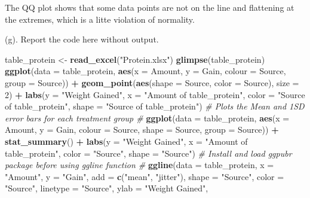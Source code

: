 \documentclass[]{article}
\newenvironment{Shaded}{\begin{snugshade}}{\end{snugshade}}
\newcommand{\CommentTok}[1]{\textcolor[rgb]{0.56,0.35,0.01}{\textit{#1}}}
\newcommand{\DataTypeTok}[1]{\textcolor[rgb]{0.13,0.29,0.53}{#1}}
\newcommand{\DecValTok}[1]{\textcolor[rgb]{0.00,0.00,0.81}{#1}}
\newcommand{\KeywordTok}[1]{\textcolor[rgb]{0.13,0.29,0.53}{\textbf{#1}}}
\newcommand{\NormalTok}[1]{#1}
\newcommand{\OperatorTok}[1]{\textcolor[rgb]{0.81,0.36,0.00}{\textbf{#1}}}
\newcommand{\StringTok}[1]{\textcolor[rgb]{0.31,0.60,0.02}{#1}}
\begin{document}
The QQ plot shows that some data points are not on the line and
flattening at the extremes, which is a litte violation of normality.

(g). \textcolor[rgb]{0.5,0.5,0.5}{Report the code here without output.}

\begin{Shaded}
\begin{Highlighting}[]
\NormalTok{table_protein <-}\StringTok{ }\KeywordTok{read_excel}\NormalTok{(}\StringTok{"Protein.xlsx"}\NormalTok{)}
\KeywordTok{glimpse}\NormalTok{(table_protein)}
\KeywordTok{ggplot}\NormalTok{(}\DataTypeTok{data =}\NormalTok{ table_protein, }\KeywordTok{aes}\NormalTok{(}\DataTypeTok{x =}\NormalTok{ Amount, }\DataTypeTok{y =}\NormalTok{ Gain, }\DataTypeTok{colour =}\NormalTok{ Source, }\DataTypeTok{group =}\NormalTok{ Source)) }\OperatorTok{+}\StringTok{ }
\StringTok{    }\KeywordTok{geom_point}\NormalTok{(}\KeywordTok{aes}\NormalTok{(}\DataTypeTok{shape =}\NormalTok{ Source, }\DataTypeTok{color =}\NormalTok{ Source), }\DataTypeTok{size =} \DecValTok{2}\NormalTok{) }\OperatorTok{+}\StringTok{ }\KeywordTok{labs}\NormalTok{(}\DataTypeTok{y =} \StringTok{"Weight Gained"}\NormalTok{, }
    \DataTypeTok{x =} \StringTok{"Amount of table_protein"}\NormalTok{, }\DataTypeTok{color =} \StringTok{"Source of table_protein"}\NormalTok{, }\DataTypeTok{shape =} \StringTok{"Source of table_protein"}\NormalTok{)}
\CommentTok{# Plots the Mean and 1SD error bars for each treatment group #}
\KeywordTok{ggplot}\NormalTok{(}\DataTypeTok{data =}\NormalTok{ table_protein, }\KeywordTok{aes}\NormalTok{(}\DataTypeTok{x =}\NormalTok{ Amount, }\DataTypeTok{y =}\NormalTok{ Gain, }\DataTypeTok{colour =}\NormalTok{ Source, }\DataTypeTok{shape =}\NormalTok{ Source, }
    \DataTypeTok{group =}\NormalTok{ Source)) }\OperatorTok{+}\StringTok{ }\KeywordTok{stat_summary}\NormalTok{() }\OperatorTok{+}\StringTok{ }\KeywordTok{labs}\NormalTok{(}\DataTypeTok{y =} \StringTok{"Weight Gained"}\NormalTok{, }\DataTypeTok{x =} \StringTok{"Amount of table_protein"}\NormalTok{, }
    \DataTypeTok{color =} \StringTok{"Source"}\NormalTok{, }\DataTypeTok{shape =} \StringTok{"Source"}\NormalTok{)}
\CommentTok{# Install and load ggpubr package before using ggline function #}
\KeywordTok{ggline}\NormalTok{(}\DataTypeTok{data =}\NormalTok{ table_protein, }\DataTypeTok{x =} \StringTok{"Amount"}\NormalTok{, }\DataTypeTok{y =} \StringTok{"Gain"}\NormalTok{, }\DataTypeTok{add =} \KeywordTok{c}\NormalTok{(}\StringTok{"mean"}\NormalTok{, }\StringTok{"jitter"}\NormalTok{), }
    \DataTypeTok{shape =} \StringTok{"Source"}\NormalTok{, }\DataTypeTok{color =} \StringTok{"Source"}\NormalTok{, }\DataTypeTok{linetype =} \StringTok{"Source"}\NormalTok{, }\DataTypeTok{ylab =} \StringTok{"Weight Gained"}\NormalTok{, }

\end{Highlighting}
\end{Shaded}
\end{document}
